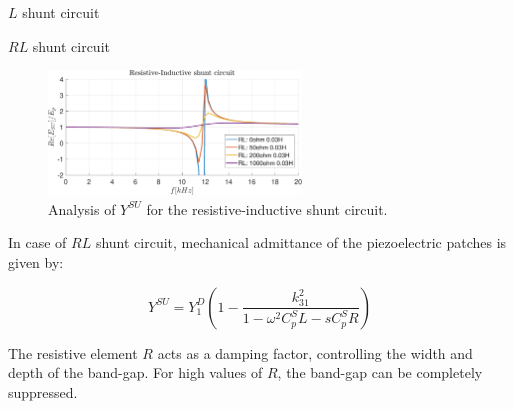 \begin{frame}{$L$ shunt circuit}

\end{frame}



\begin{frame}{$RL$ shunt circuit}

    \begin{figure}[H]
        \centering
        \includegraphics[width=0.6\textwidth]{./img/MATLAB/Y_SU_Resistive-Inductive shunt circuit.pdf}
        \caption{Analysis of $Y^{SU}$ for the resistive-inductive shunt circuit.}
    \end{figure}

    In case of $RL$ shunt circuit, mechanical admittance of the piezoelectric patches is given by:

    \begin{equation}
        Y^{SU} = Y_1^D \left( 1 - \frac{k_{31}^2}{1 -\omega^2 C_p^S L - s C_p^S R} \right)
    \end{equation}

    The resistive element $R$ acts as a damping factor, controlling the width and depth of the band-gap.
    For high values of $R$, the band-gap can be completely suppressed.

\end{frame}


